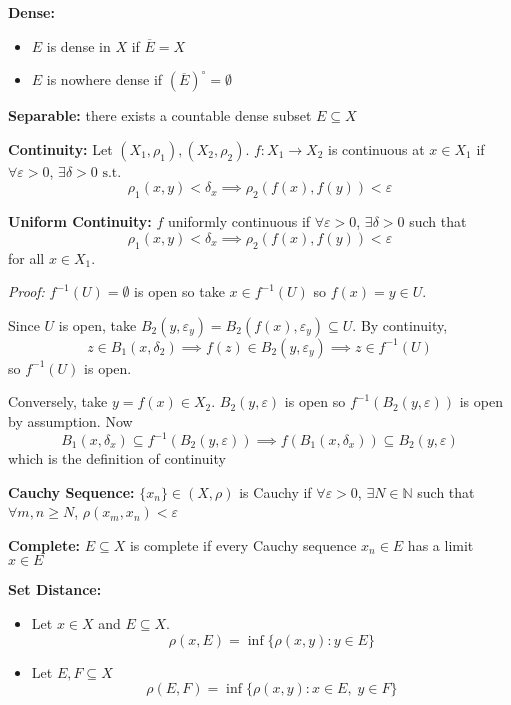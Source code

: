 \documentclass[12pt]{article}
\newcommand{\N}{\mathbb{N}}
\newcommand{\ep}{\varepsilon}
\newcommand{\sub}{\subseteq}
\newcommand{\st}{\text{ s.t. }}
\renewcommand{\bar}[1]{\overline{#1}}
\newenvironment*{tbox}[2][gray]{
    \begin{tcolorbox}[
        parbox=false,
        colback=#1!5!white,
        colframe=#1!75!black,
        breakable,
        title={#2}
    ]}
    {\end{tcolorbox}}
\begin{document}
    \textbf{Dense:} 
    \begin{itemize}
        \item $E$ is dense in $X$ if $\bar E = X$
        \item $E$ is nowhere dense if $(\bar E)^{\circ} = \emptyset$
    \end{itemize}

    \textbf{Separable:} there exists a countable dense subset $E \sub X$

    \textbf{Continuity:} Let $(X_1, \rho_1), (X_2, \rho_2)$. $f: X_1 \to X_2$ is continuous at $x \in X_1$ if $\forall \ep > 0$, $\exists \delta > 0 \st$
    \[\rho_1(x, y) < \delta_x \implies \rho_2(f(x), f(y)) < \ep\] 

    \textbf{Uniform Continuity:} $f$ uniformly continuous if $\forall \ep > 0$, $\exists \delta > 0$ such that 
    \[\rho_1(x, y) < \delta_x \implies \rho_2(f(x), f(y)) < \ep\] 
    for all $x \in X_1$. 

    \begin{tbox}{\textbf{Proposition:} $f: X_1 \to X_2$ is continuous iff $f^{-1}(U) \sub X_1$ is open for all open $U \sub X_2$}
        \emph{Proof:} $f^{-1}(U) = \emptyset$ is open so take $x \in f^{-1}(U)$ so $f(x) = y \in U$. 

        Since $U$ is open, take $B_2(y, \ep_y) = B_2(f(x), \ep_y) \sub U$. By continuity, \[z \in B_1(x, \delta_2) \implies f(z) \in B_2(y, \ep_y) \implies z \in f^{-1}(U)\] 
        so $f^{-1}(U)$ is open. 
        
        Conversely, take $y = f(x) \in X_2$. $B_2(y, \ep)$ is open so $f^{-1}(B_2(y, \ep))$ is open by assumption. Now 
        \[B_1(x, \delta_x) \sub f^{-1}(B_2(y, \ep)) \implies f(B_1(x, \delta_x)) \sub B_2(y, \ep)\] 
        which is the definition of continuity
    \end{tbox}

    \textbf{Cauchy Sequence:} $\{x_n\} \in (X, \rho)$ is Cauchy if $\forall \ep > 0$, $\exists N \in \N$ such that $\forall m, n \geq N$, $\rho(x_m, x_n) < \ep$

    \textbf{Complete:} $E \sub X$ is complete if every Cauchy sequence $x_n \in E$ has a limit $x \in E$ 

    \textbf{Set Distance:} 
    \begin{itemize}
        \item Let $x \in X$ and $E \sub X$. 
        \[\rho(x, E) = \inf\{\rho(x, y): y \in E\}\]

        \item Let $E, F \sub X$
        \[\rho(E, F) = \inf\{\rho(x, y): x \in E, \; y \in F\}\]
    \end{itemize}
\end{document}
